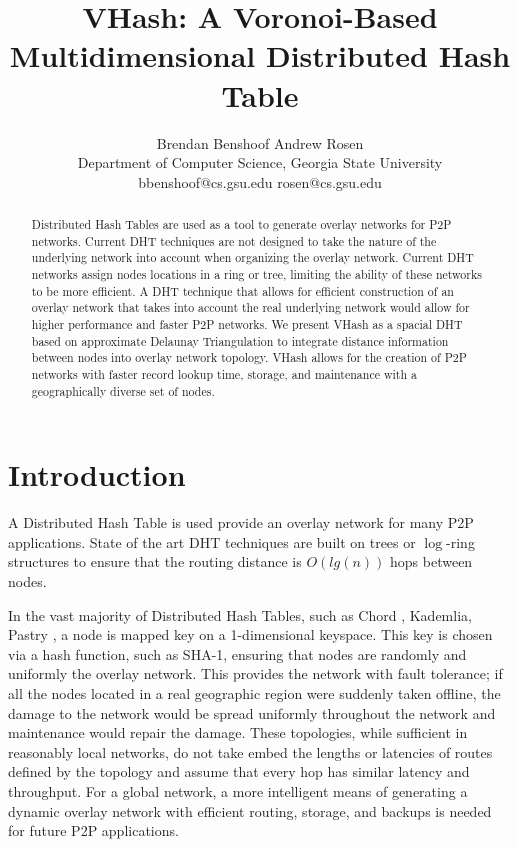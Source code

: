 \documentclass{IEEEtran}
\title{VHash: A Voronoi-Based Multidimensional Distributed Hash Table}
\author{Brendan Benshoof \qquad Andrew Rosen  \\Department of Computer Science, Georgia State University\\  bbenshoof@cs.gsu.edu \qquad rosen@cs.gsu.edu }
\date{} %
\begin{document}
\maketitle

\begin{abstract}
Distributed Hash Tables are used as a tool to generate overlay networks for P2P networks. Current DHT techniques are not designed to take the nature of the underlying network into account when organizing the overlay network. Current DHT networks assign nodes locations in a ring or tree, limiting the ability of these networks to be more efficient.
A DHT technique that allows for efficient construction of an overlay network that takes into account the real underlying network would allow for higher performance and faster P2P networks.
We present VHash as a spacial DHT based on approximate Delaunay Triangulation to integrate distance information between nodes into overlay network topology.
VHash allows for the creation of P2P networks with faster record lookup time, storage, and maintenance with a geographically diverse set of nodes.

\end{abstract}
\section{Introduction}
A Distributed Hash Table is used provide an overlay network for many P2P applications. State of the art DHT techniques are built on trees or $\log$-ring structures to ensure that the routing distance is $O(lg(n))$ hops between nodes. 

In the vast majority of Distributed Hash Tables, such as Chord \cite{chord}, Kademlia\cite{kademlia}, Pastry \cite{pastry}, a node is mapped key on a 1-dimensional keyspace.  This key is chosen via a hash function, such as SHA-1, ensuring that nodes are randomly and uniformly the overlay network.
This provides the network with fault tolerance; if all the nodes located in a real geographic region were suddenly taken offline, the damage to the network would be spread uniformly throughout the network and maintenance would repair the damage.  
These topologies, while sufficient in reasonably local networks, do not take embed the lengths or latencies of routes defined by the topology and assume that every hop has similar latency and throughput. For a global network, a more intelligent means of generating a dynamic overlay network with efficient routing, storage, and backups is needed for future P2P applications.
\end{document}
